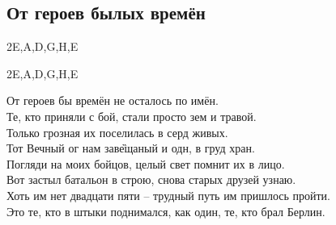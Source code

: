 \documentclass[fleqn,a5paper,12pt,twoside]{guitartabs}
\begin{document}
\subsection*{От героев былых времён}
    \begin {tabline}{2}{}{}{E,A,D,G,H,E}
        \nextbar
    \end {tabline}
    \begin {tabline}{2}{}{}{E,A,D,G,H,E}
        \nextbar
    \end {tabline}
    От героев бы времён не осталось по имён.\\                 
    Те, кто приняли с бой, стали просто зем и травой.\\
    Только грозная  их поселилась в серд живых.  \\      
    Тот Вечный ог нам зав\G{ещаный} и одн,  в груд хран.\\

    \-\hspace{2mm}Погляди на моих бойцов, целый свет помнит их в лицо.\\
    \-\hspace{2mm}Вот застыл батальон в строю, снова старых друзей узнаю.\\
    \-\hspace{2mm}Хоть им нет двадцати пяти -- трудный путь им пришлось \mbox{пройти.}\\
    \-\hspace{2mm}Это те, кто в штыки поднимался, как один, те, кто брал Берлин.\\
\end{document}
